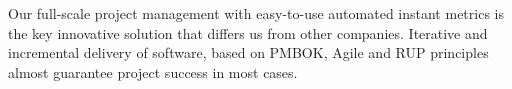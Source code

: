 
Our full-scale project management with easy-to-use automated
instant metrics is the key innovative solution that differs us
from other companies. Iterative and incremental delivery of software,
based on PMBOK, Agile and RUP principles almost guarantee project success
in most cases.

